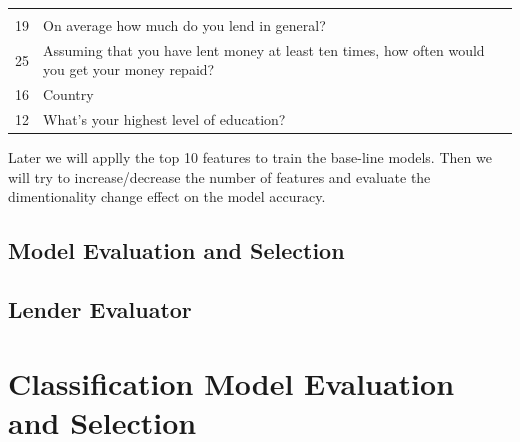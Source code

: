 \begin{longtable}[]{@{}ll@{}}
\begin{minipage}[t]{0.89\columnwidth}
\end{minipage}\tabularnewline
\begin{minipage}[t]{0.05\columnwidth}\raggedright
19\strut
\end{minipage} & \begin{minipage}[t]{0.89\columnwidth}\raggedright
On average how much do you lend in general?\strut
\end{minipage}\tabularnewline
\begin{minipage}[t]{0.05\columnwidth}\raggedright
25\strut
\end{minipage} & \begin{minipage}[t]{0.89\columnwidth}\raggedright
Assuming that you have lent money at least ten times, how often would
you get your money repaid?\strut
\end{minipage}\tabularnewline
\begin{minipage}[t]{0.05\columnwidth}\raggedright
16\strut
\end{minipage} & \begin{minipage}[t]{0.89\columnwidth}\raggedright
Country\strut
\end{minipage}\tabularnewline
\begin{minipage}[t]{0.05\columnwidth}\raggedright
12\strut
\end{minipage} & \begin{minipage}[t]{0.89\columnwidth}\raggedright
What's your highest level of education?\strut
\end{minipage}\tabularnewline
\bottomrule
\end{longtable}

Later we will applly the top 10 features to train the base-line models.
Then we will try to increase/decrease the number of features and
evaluate the dimentionality change effect on the model accuracy.

\hypertarget{model-evaluation-and-selection}{%
\subsection{Model Evaluation and
Selection}\label{model-evaluation-and-selection}}

\hypertarget{lender-evaluator}{%
\subsection{Lender Evaluator}\label{lender-evaluator}}

\hypertarget{classification-model-evaluation-and-selection}{%
\section{Classification Model Evaluation and
Selection}\label{classification-model-evaluation-and-selection}}

